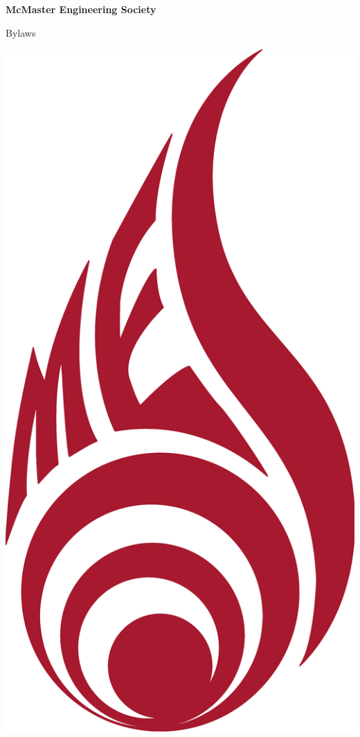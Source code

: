 \begin{titlepage}
 \begin{center}

  {\Huge \textbf{McMaster Engineering Society}}
  \newline

  {\Huge Bylaws}

  \vfill
  \includegraphics[width=0.5\linewidth]{Logo_MES_Red}
  \vfill

 \end{center}
\end{titlepage}
